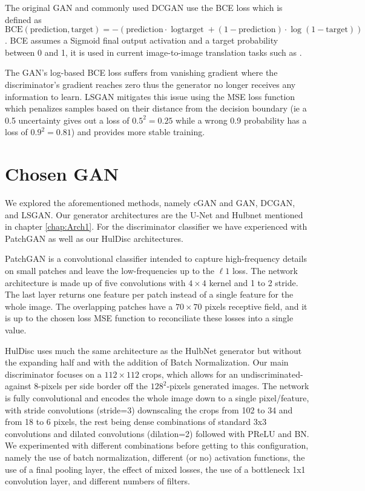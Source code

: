 The original \ac{GAN} and commonly used \ac{DCGAN} use the \ac{BCE} loss which is defined as $\text{BCE}(\text{prediction}, \text{target})=-(\text{prediction}\cdot{\log{\text{target}}}+(1-\text{prediction})\cdot \log{(1-\text{target})})$. \ac{BCE} assumes a Sigmoid final output activation and a target probability between 0 and 1, it is used in current image-to-image translation tasks such as \cite{pix2pix}\cite{cyclegan}.

The \ac{GAN}'s log-based \ac{BCE} loss suffers from vanishing gradient where the discriminator's gradient reaches zero thus the generator no longer receives any information to learn. \ac{LSGAN} mitigates this issue using the \acl{MSE} loss function which penalizes samples based on their distance from the decision boundary (ie a 0.5 uncertainty gives out a loss of $0.5^2=0.25$ while a wrong 0.9 probability has a loss of $0.9^2=0.81$) and provides more stable training. \cite{lsgan}

\section{Chosen GAN}\label{HulDisc}

We explored the aforementioned methods, namely \ac{cGAN} and \ac{GAN}, \ac{DCGAN}, and \ac{LSGAN}. Our generator architectures are the U-Net \cite{unet} and Hulbnet mentioned in chapter \ref{chap:Arch1}. For the discriminator classifier we have experienced with PatchGAN \cite{pix2pix} as well as our HulDisc architectures.


PatchGAN is a convolutional classifier intended to capture high-frequency details on small patches and leave the low-frequencies up to the $\ell 1$ loss. The network architecture is made up of five convolutions with $4 \times 4$ kernel and 1 to 2 stride. The last layer returns one feature per patch instead of a single feature for the whole image. The overlapping patches have a $70 \times 70$ pixels receptive field, and it is up to the chosen loss \ac{MSE} function to reconciliate these losses into a single value.

HulDisc uses much the same architecture as the HulbNet generator but without the expanding half and with the addition of Batch Normalization. Our main discriminator focuses on a $112\times 112$ crops, which allows for an undiscriminated-against 8-pixels per side border off the $128^2$-pixels generated images. The network is fully convolutional and encodes the whole image down to a single pixel/feature, with stride convolutions (stride=3) downscaling the crops from 102 to 34 and from 18 to 6 pixels, the rest being dense combinations of standard 3x3 convolutions and dilated convolutions (dilation=2) followed with \ac{PReLU} and \acl{BN}. We experimented with different combinations before getting to this configuration, namely the use of batch normalization, different (or no) activation functions, the use of a final pooling layer, the effect of mixed losses, the use of a bottleneck 1x1 convolution layer, and different numbers of filters.

